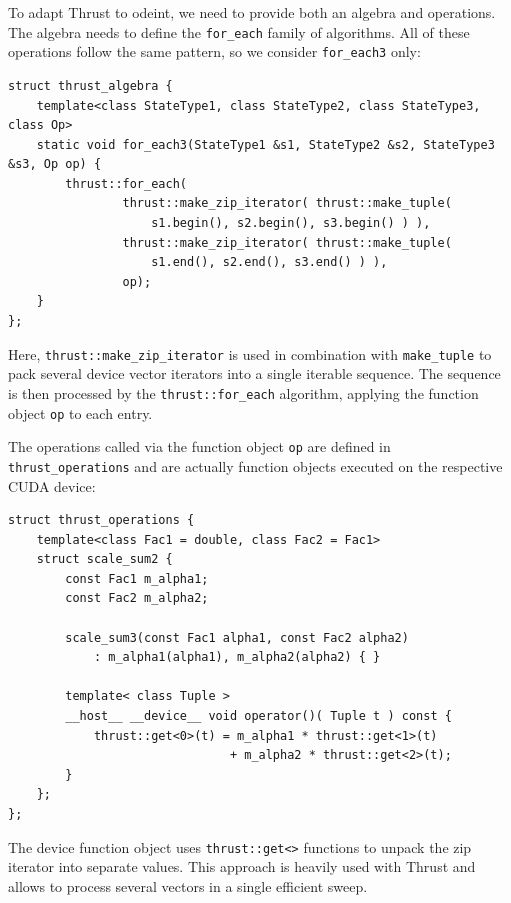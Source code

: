 \documentclass[final]{siamltex}
\newcommand{\code}[1]{\lstinline|#1|}
\begin{document}
To adapt Thrust to odeint, we need to provide both an algebra and
operations. The algebra needs to define the \code{for_each} family of
algorithms. All of these operations follow the same pattern,
so we consider \code{for_each3} only:
\begin{lstlisting}
struct thrust_algebra {
    template<class StateType1, class StateType2, class StateType3, class Op>
    static void for_each3(StateType1 &s1, StateType2 &s2, StateType3 &s3, Op op) {
        thrust::for_each(
                thrust::make_zip_iterator( thrust::make_tuple(
                    s1.begin(), s2.begin(), s3.begin() ) ),
                thrust::make_zip_iterator( thrust::make_tuple(
                    s1.end(), s2.end(), s3.end() ) ),
                op);
    }
};
\end{lstlisting}
Here, \code{thrust::make_zip_iterator} is used in combination with
\code{make_tuple} to pack several device vector iterators into a single
iterable sequence.  The sequence is then processed by the
\code{thrust::for_each} algorithm, applying the function object \code{op} to
each entry.

The operations called via the function object \code{op} are defined in
\code{thrust_operations} and are actually function objects executed on the
respective CUDA device:
\begin{lstlisting}
struct thrust_operations {
    template<class Fac1 = double, class Fac2 = Fac1>
    struct scale_sum2 {
        const Fac1 m_alpha1;
        const Fac2 m_alpha2;

        scale_sum3(const Fac1 alpha1, const Fac2 alpha2)
            : m_alpha1(alpha1), m_alpha2(alpha2) { }

        template< class Tuple >
        __host__ __device__ void operator()( Tuple t ) const {
            thrust::get<0>(t) = m_alpha1 * thrust::get<1>(t)
                               + m_alpha2 * thrust::get<2>(t);
        }
    };
};
\end{lstlisting}
The device function object uses \code{thrust::get<>} functions to unpack the
zip iterator into separate values.  This approach is heavily used with Thrust
and allows to process several vectors in a single efficient sweep.
\end{document}
